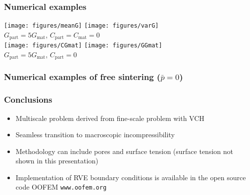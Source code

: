 \documentclass[11pt]{beamer} %
\begin{document}
\begin{frame}
 \frametitle{Numerical examples}
\begin{center}
%
\texttt{[image: figures/meanG]}
%
\texttt{[image: figures/varG]}
\\
$G_\mathrm{part} = 5 G_\mathrm{mat}$, $C_\mathrm{part} = C_\mathrm{mat} = 0$
\\%
%
\texttt{[image: figures/CGmat]}
%
\texttt{[image: figures/GGmat]}
\\
$G_\mathrm{part} = 5 G_\mathrm{mat}$, $C_\mathrm{part} = 0$
\end{center}
\end{frame}

\begin{frame}
 \frametitle{Numerical examples of free sintering ($\bar{p} = 0$)}
\begin{center}
\end{center}
\end{frame}

\begin{frame}
 \frametitle{Conclusions}
 \begin{itemize}
 \item Multiscale problem derived from fine-scale problem with VCH
 \item Seamless transition to macroscopic incompressibility
 \item Methodology can include pores and surface tension (surface tension not shown in this presentation)
 \item Implementation of RVE boundary conditions is available in the open source code OOFEM \texttt{www.oofem.org}
 \end{itemize}
\end{frame}
\end{document}
